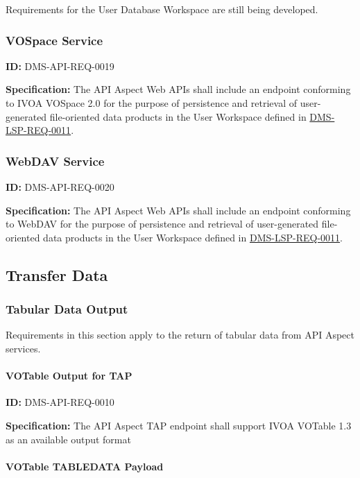 \documentclass[SE,toc]{lsstdoc}
\begin{document}
Requirements for the User Database Workspace are still being developed.

\subsubsection{VOSpace Service}

\label{DMS-API-REQ-0019}
\textbf{ID:} DMS-API-REQ-0019

\textbf{Specification:}
The API Aspect Web APIs shall include an endpoint conforming to IVOA VOSpace 2.0 for the purpose of persistence and retrieval of user-generated file-oriented data products in the User Workspace defined in \hyperref[DMS-LSP-REQ-0011]{DMS-LSP-REQ-0011}.

\subsubsection{WebDAV Service}

\label{DMS-API-REQ-0020}
\textbf{ID:} DMS-API-REQ-0020

\textbf{Specification:}
The API Aspect Web APIs shall include an endpoint conforming to WebDAV for the purpose of persistence and retrieval of user-generated file-oriented data products in the User Workspace defined in \hyperref[DMS-LSP-REQ-0011]{DMS-LSP-REQ-0011}.

\subsection{Transfer Data}

\subsubsection{Tabular Data Output}

Requirements in this section apply to the return of tabular data from API Aspect services.

\paragraph{VOTable Output for TAP}\hfill  %

\label{DMS-API-REQ-0010}
\textbf{ID:} DMS-API-REQ-0010

\textbf{Specification:}
The API Aspect TAP endpoint shall support IVOA VOTable 1.3 as an available output format

\paragraph{VOTable TABLEDATA Payload}\hfill  %
\end{document}
